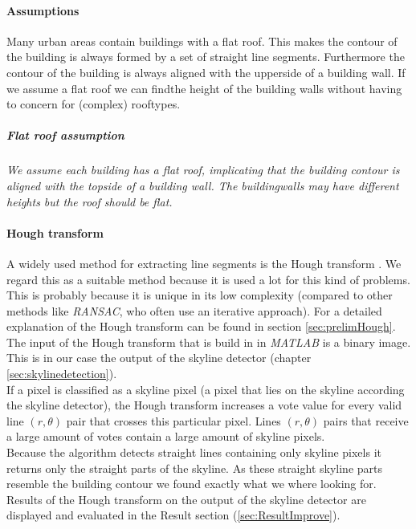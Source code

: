 \paragraph{Assumptions}
	Many urban areas contain buildings with a flat roof. This makes the contour
	of the building is always formed by a set of straight line segments.
	Furthermore the contour of the building is always aligned with the upperside
	of a building wall.  
	If we assume a flat roof we can findthe height of the building walls without
	having to concern for (complex) rooftypes.

	\subparagraph{Flat roof assumption}
	\emph{We assume each building has a flat roof, implicating that the building
	contour is aligned with the topside of a building wall.  The buildingwalls
	may have different heights but the roof should be flat.}\\


\paragraph{Hough transform}
	A widely used method for extracting line segments is the Hough transform
	\cite{Hough}.
	We regard this as a suitable method because it is
	used a lot for this kind of problems. This is probably because it is unique
	in its low complexity (compared to other methods like
	\emph{RANSAC}, who often use an iterative approach).
	For a detailed explanation of the Hough transform can be found in section
	\ref{sec:prelimHough}.\\

	The input of the Hough transform that is build in in \emph{MATLAB} is a binary
	image. This is in our case the output of the skyline detector (chapter
	\ref{sec:skylinedetection}).\\
	If a pixel is classified as a skyline pixel (a pixel that lies on the
	skyline according the skyline detector), the Hough transform increases
	a vote value for every valid line $(r,\theta)$ pair that crosses this
	particular pixel.  
	Lines $(r,\theta)$ pairs that receive a large amount of votes
	contain a large amount of skyline pixels.\\
	Because the algorithm detects straight lines containing only skyline pixels
	it returns only the straight parts of the skyline.
	As these straight skyline parts resemble the building contour
	we found exactly what we where looking for.\\

	Results of the Hough transform on the output of the skyline detector are
	displayed and evaluated in the Result section (\ref{sec:ResultImprove}).

